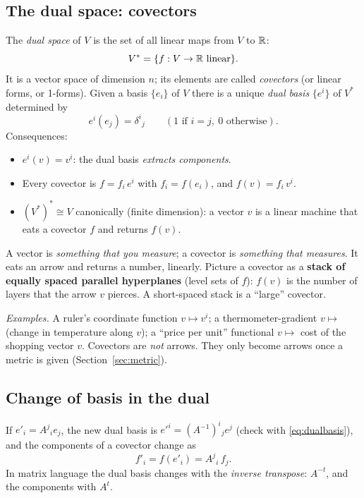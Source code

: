 \subsection{The dual space: covectors}\label{sec:dualspace}

\begin{formal}
The \emph{dual space} of $V$ is the set of all linear maps from $V$ to $\mathbb{R}$:
\[
V^*=\{f:V\to\mathbb{R}\ \text{linear}\}.
\]
It is a vector space of dimension $n$; its elements are called \emph{covectors} (or linear forms, or 1-forms). Given a basis $\{e_i\}$ of $V$ there is a unique \emph{dual basis} $\{e^{i}\}$ of $V^*$ determined by
\begin{equation}\label{eq:dualbasis}
e^{i}(e_j)=\delta^i{}_j\qquad(\text{1 if }i=j,\ 0\text{ otherwise}).
\end{equation}
Consequences:
\begin{itemize}[nosep]
\item $e^{i}(v)=v^i$: the dual basis \emph{extracts components}.
\item Every covector is $f=f_i\,e^{i}$ with $f_i=f(e_i)$, and $f(v)=f_i\,v^i$.
\item $(V^*)^*\cong V$ canonically (finite dimension): a vector $v$ is a linear machine that eats a covector $f$ and returns $f(v)$.
\end{itemize}
\end{formal}

\begin{intuition}
A vector is \emph{something that you measure}; a covector is \emph{something that measures}. It eats an arrow and returns a number, linearly. Picture a covector as a \textbf{stack of equally spaced parallel hyperplanes} (level sets of $f$): $f(v)$ is the number of layers that the arrow $v$ pierces. A short-spaced stack is a ``large'' covector.

\emph{Examples.} A ruler's coordinate function $v\mapsto v^i$; a thermometer-gradient $v\mapsto$ (change in temperature along $v$); a ``price per unit'' functional $v\mapsto$ cost of the shopping vector $v$. Covectors are \emph{not} arrows. They only become arrows once a metric is given (Section~\ref{sec:metric}).
\end{intuition}

\subsection*{Change of basis in the dual}
If $e'_i=A^j{}_ie_j$, the new dual basis is $e'^{i}=(A^{-1})^i{}_je^{j}$ (check with \eqref{eq:dualbasis}), and the components of a covector change as
\begin{equation}\label{eq:covchange}
f'_i=f(e'_i)=A^j{}_i\,f_j .
\end{equation}
In matrix language the dual basis changes with the \emph{inverse transpose}: $A^{-t}$, and the components with $A^{t}$.

